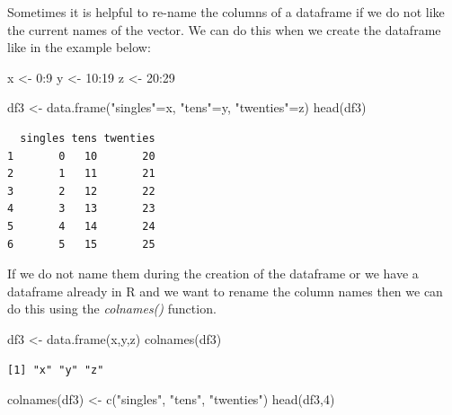 \documentclass[
  letterpaper,
  DIV=11,
  numbers=noendperiod]{scrreprt}
\newenvironment{Shaded}{\begin{snugshade}}{\end{snugshade}}
\newcommand{\DecValTok}[1]{\textcolor[rgb]{0.68,0.00,0.00}{#1}}
\newcommand{\FunctionTok}[1]{\textcolor[rgb]{0.28,0.35,0.67}{#1}}
\newcommand{\NormalTok}[1]{\textcolor[rgb]{0.00,0.23,0.31}{#1}}
\newcommand{\OtherTok}[1]{\textcolor[rgb]{0.00,0.23,0.31}{#1}}
\newcommand{\SpecialCharTok}[1]{\textcolor[rgb]{0.37,0.37,0.37}{#1}}
\newcommand{\StringTok}[1]{\textcolor[rgb]{0.13,0.47,0.30}{#1}}
\begin{document}
Sometimes it is helpful to re-name the columns of a dataframe if we do
not like the current names of the vector. We can do this when we create
the dataframe like in the example below:

\begin{Shaded}
\begin{Highlighting}[]
\NormalTok{x }\OtherTok{\textless{}{-}} \DecValTok{0}\SpecialCharTok{:}\DecValTok{9}
\NormalTok{y }\OtherTok{\textless{}{-}} \DecValTok{10}\SpecialCharTok{:}\DecValTok{19}
\NormalTok{z }\OtherTok{\textless{}{-}} \DecValTok{20}\SpecialCharTok{:}\DecValTok{29}

\NormalTok{df3 }\OtherTok{\textless{}{-}} \FunctionTok{data.frame}\NormalTok{(}\StringTok{"singles"}\OtherTok{=}\NormalTok{x, }\StringTok{"tens"}\OtherTok{=}\NormalTok{y, }\StringTok{"twenties"}\OtherTok{=}\NormalTok{z)}
\FunctionTok{head}\NormalTok{(df3)}
\end{Highlighting}
\end{Shaded}

\begin{verbatim}
  singles tens twenties
1       0   10       20
2       1   11       21
3       2   12       22
4       3   13       23
5       4   14       24
6       5   15       25
\end{verbatim}

If we do not name them during the creation of the dataframe or we have a
dataframe already in R and we want to rename the column names then we
can do this using the \emph{colnames()} function.

\begin{Shaded}
\begin{Highlighting}[]
\NormalTok{df3 }\OtherTok{\textless{}{-}} \FunctionTok{data.frame}\NormalTok{(x,y,z)}
\FunctionTok{colnames}\NormalTok{(df3)}
\end{Highlighting}
\end{Shaded}

\begin{verbatim}
[1] "x" "y" "z"
\end{verbatim}

\begin{Shaded}
\begin{Highlighting}[]
\FunctionTok{colnames}\NormalTok{(df3) }\OtherTok{\textless{}{-}} \FunctionTok{c}\NormalTok{(}\StringTok{"singles"}\NormalTok{, }\StringTok{"tens"}\NormalTok{, }\StringTok{"twenties"}\NormalTok{)}
\FunctionTok{head}\NormalTok{(df3,}\DecValTok{4}\NormalTok{)}
\end{Highlighting}
\end{Shaded}
\end{document}
